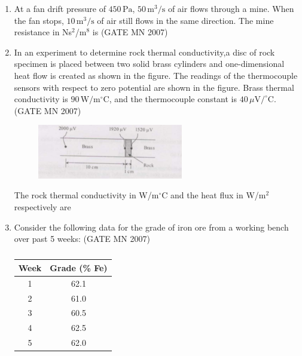 \documentclass[journal]{IEEEtran}
\begin{document}
\begin{enumerate}
\item At a fan drift pressure of $450\,\text{Pa}$, $50\,\text{m}^3/\text{s}$ of air flows through a mine.  
When the fan stops, $10\,\text{m}^3/\text{s}$ of air still flows in the same direction.  
The mine resistance in Ns$^2$/m$^8$ is
\hfill (GATE MN 2007)
\begin{enumerate}
\end{enumerate}


\item In an experiment to determine rock thermal conductivity,a disc of rock specimen is placed between two solid brass cylinders and one-dimensional heat flow is created as shown in the figure.  
The readings of the thermocouple sensors with respect to zero potential are shown in the figure.  
Brass thermal conductivity is $90\,\text{W/m$^\circ$C}$, and the thermocouple constant is $40\,\mu\text{V}/^\circ$C.  
\hfill (GATE MN 2007)
\begin{figure}[H]
    \centering
    \includegraphics[width=0.6\textwidth]{Screenshot_2025_0812_172517.png}
\caption{}
    \label{fig:Q56}
\end{figure}

The rock thermal conductivity in W/m$^\circ$C and the heat flux in W/m$^2$ respectively are  
\begin{enumerate}
\end{enumerate}


\item Consider the following data for the grade of iron ore from a working bench over past 5 weeks:
\hfill (GATE MN 2007)
\begin{table}[H]
    \centering\normalsize
\begin{tabular}{|c|c|}
\hline
Week & Grade (\% Fe) \\
\hline
1 & 62.1 \\
\hline
2 & 61.0 \\
\hline
3 & 60.5 \\
\hline
4 & 62.5 \\
\hline
5 & 62.0 \\
\hline
\end{tabular}
   \caption{}
    \label{tab:Q57}
\end{table}


\end{enumerate}
\end{document}

